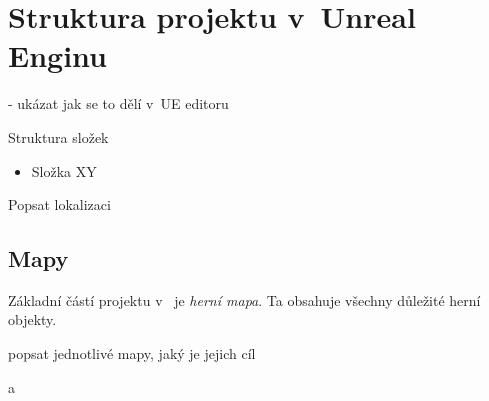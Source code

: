 
\section{Struktura projektu v~Unreal Enginu}
\label{sec:ueStructure}

- ukázat jak se to dělí v~UE editoru

Struktura složek

\begin{itemize}
	\item Složka XY
\end{itemize}

Popsat lokalizaci

\subsection{Mapy}

Základní částí projektu v~ je \textit{herní mapa}. Ta obsahuje všechny důležité herní objekty.

popsat jednotlivé mapy, jaký je jejich cíl

a

